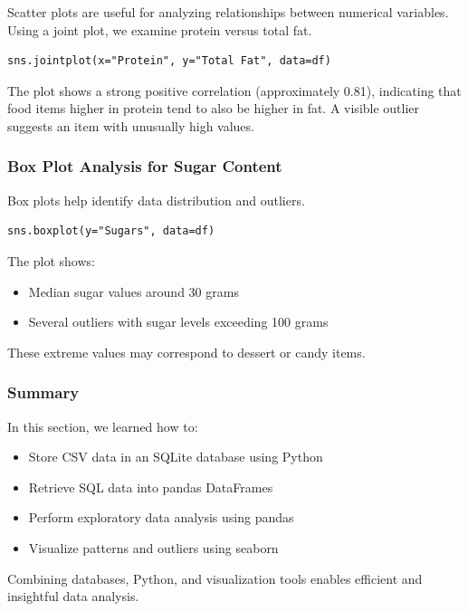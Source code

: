 \documentclass{article}
\begin{document}
Scatter plots are useful for analyzing relationships between numerical variables. Using a joint plot, we examine protein versus total fat.

\begin{verbatim}
sns.jointplot(x="Protein", y="Total Fat", data=df)
\end{verbatim}
The plot shows a strong positive correlation (approximately 0.81), indicating that food items higher in protein tend to also be higher in fat. A visible outlier suggests an item with unusually high values.

\subsubsection{Box Plot Analysis for Sugar Content}

Box plots help identify data distribution and outliers.

\begin{verbatim}
sns.boxplot(y="Sugars", data=df)
\end{verbatim}
The plot shows:
\begin{itemize}
    \item Median sugar values around 30 grams
    \item Several outliers with sugar levels exceeding 100 grams
\end{itemize}

These extreme values may correspond to dessert or candy items.

\subsubsection{Summary}

In this section, we learned how to:
\begin{itemize}
    \item Store CSV data in an SQLite database using Python
    \item Retrieve SQL data into pandas DataFrames
    \item Perform exploratory data analysis using pandas
    \item Visualize patterns and outliers using seaborn
\end{itemize}

Combining databases, Python, and visualization tools enables efficient and insightful data analysis.
\end{document}
